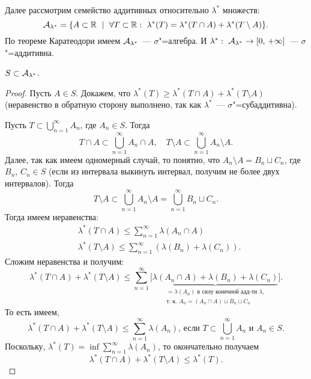 Далее рассмотрим семейство аддитивных относительно $\lambda^*$ множеств:
\[
    \CA_{\lambda^*}=\{A\subset\R\ \mid\ \forall T\subset \R:\ \lambda^*(T)=\lambda^*(T\cap A)+\lambda^*(T\setminus A)\}.
\]
По теореме Каратеодори имеем $\mathcal{A}_{\lambda^*}$~--- $\sigma$"=алгебра. И $\lambda^*:\ \CA_{\lambda^*}\rightarrow[0,\,+\infty]$~--- $\sigma$"=аддитивна.
\begin{claim}
    $S\subset \mathcal{A}_{\lambda^*}$.

    \begin{proof}
        Пусть $A\in S$. Докажем, что $\lambda^*(T)\geqslant\lambda^*(T\cap A)+\lambda^*(T\setminus A)$ (неравенство в обратную сторону выполнено, так как
        $\lambda^*$~--- $\sigma$"=субаддитивна).

        Пусть $T\subset\bigcup\limits_{n=1}^{\infty}A_n$, где $A_n\in S$. Тогда
        \[
            T\cap A\subset \bigcup\limits_{n=1}^{\infty}A_n\cap A,\quad T\setminus A\subset \bigcup\limits_{n=1}^{\infty}A_n\setminus A.
        \]
        Далее, так как имеем одномерный случай, то понятно, что $A_n\setminus A=B_n\sqcup C_n$, где $B_n,\, C_n\in S$ (если из интервала выкинуть интервал, получим не более двух
        интервалов). Тогда
        \[
            T\setminus A\subset \bigcup\limits_{n=1}^{\infty}A_n\setminus A=\bigcup_{n=1}^{\infty} B_n\sqcup C_n.
        \]
        Тогда имеем неравенства:
        \begin{align*}
             & \lambda^*(T\cap A)\leqslant\sum_{n=1}^{\infty}\lambda(A_n\cap A)                           \\
             & \lambda^*(T\setminus A)\leqslant\sum_{n=1}^{\infty}\left(\lambda(B_n)+\lambda(C_n)\right).
        \end{align*}
        Сложим неравенства и получим:
        \[
            \lambda^*(T\cap A)+\lambda^*(T\setminus A)\leqslant \sum_{n=1}^{\infty}\biggl[\underbrace{\lambda(A_n\cap A)+\lambda(B_n)+\lambda(C_n)}_{
            \substack{=\lambda(A_n)\text{ в силу конечной адд-ти $\lambda$,} \\ \text{т. к. } A_n=(A_n\cap A)\sqcup B_n\sqcup C_n}}\biggr].
        \]
        То есть имеем,
        \[
            \lambda^*(T\cap A)+\lambda^*(T\setminus A)\leqslant \sum_{n=1}^{\infty}\lambda (A_n)\text{, если } T\subset \bigcup_{n=1}^{\infty}A_n \text{ и }
            A_n\in S.
        \]
        Поскольку, $\lambda^*(T)=\inf \sum\limits_{n=1}^{\infty}\lambda (A_n)$, то окончательно получаем
        \[
            \lambda^*(T\cap A)+\lambda^*(T\setminus A)\leqslant\lambda^*(T).
        \]

    \end{proof}
\end{claim}

